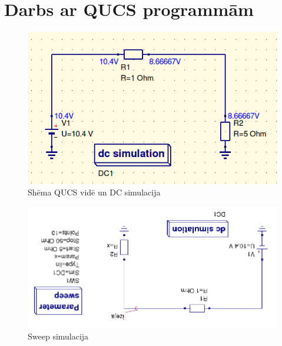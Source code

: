 \documentclass{report}
\begin{document}
\section{Darbs ar QUCS programmām}

    \begin{figure}[!htb]
    \centering
        \includegraphics[scale=0.5]{dc}
        \caption{Shēma QUCS vidē un DC simulacija}
        \label{fig:my_label}
    \end{figure}


    \begin{figure}[!htb]
    \centering
        \includegraphics[scale=0.5, angle=180]{2sch.png}
        \caption{Sweep simulacija}
        \label{fig:my_label}
    \end{figure}
    
\end{document}
